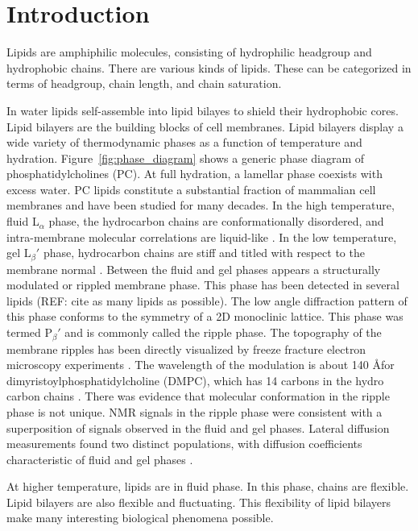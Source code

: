 \chapter{Introduction}
Lipids are amphiphilic molecules, consisting of hydrophilic headgroup
and hydrophobic chains. There are various kinds of lipids. These can be 
categorized in terms of headgroup, chain length, and chain saturation.

In water lipids self-assemble into lipid bilayes to shield their hydrophobic 
cores. Lipid bilayers are the building blocks of cell membranes. Lipid bilayers 
display a wide variety of thermodynamic phases
as a function of temperature and hydration. Figure~\ref{fig:phase_diagram}
shows a generic phase diagram of phosphatidylcholines (PC).
At full hydration, a lamellar phase coexists with excess water.
PC lipids constitute a substantial fraction of mammalian cell membranes
and have been studied for many decades.
In the high temperature, fluid L$_\alpha$ phase, the hydrocarbon chains 
are conformationally disordered, and intra-membrane molecular correlations 
are liquid-like \cite{ref:Fahey78}. In the low temperature, gel L$_\beta'$
phase, hydrocarbon chains are stiff and titled with respect to the membrane
normal \cite{ref:Tardieu73}.
Between the fluid and gel phases appears a structurally modulated or 
rippled membrane phase. This phase has been detected in several 
lipids (REF: cite as many lipids as possible).
The low angle diffraction pattern of this phase conforms to the symmetry
of a 2D monoclinic lattice. This phase was termed P$_\beta'$ and is commonly
called the ripple phase. The topography of the membrane ripples has been directly
visualized by freeze fracture electron microscopy experiments 
\cite{ref:Luna77,ref:Copeland80,ref:Ruppel83,ref:Zasadzinski87,ref:Zasadzinski88}.
The wavelength of the modulation is about 140 \AA for dimyristoylphosphatidylcholine (DMPC),
which has 14 carbons in the hydro carbon chains \cite{ref:Wack89}.
There was evidence that molecular conformation in the ripple phase is not 
unique. NMR signals in the ripple phase \cite{ref:Wittebort81} were consistent
with a superposition of signals observed in the fluid and gel phases.
Lateral diffusion measurements found two distinct populations,
with diffusion coefficients characteristic of fluid and gel phases
\cite{ref:Schneider83}. 

At higher temperature, lipids are in fluid phase. In this phase, chains
are flexible. Lipid bilayers are also flexible and fluctuating. This
flexibility of lipid bilayers make many interesting biological
phenomena possible. 


